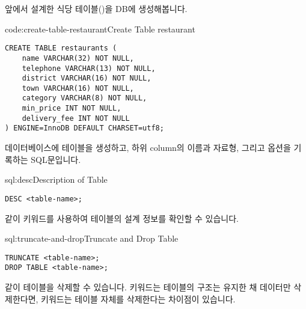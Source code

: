 앞에서 설계한 식당 테이블()을 DB에 생성해봅니다.

\begin{codeenv}{code:create-table-restaurant}{Create Table restaurant}\begin{verbatim}
CREATE TABLE restaurants (
    name VARCHAR(32) NOT NULL,
    telephone VARCHAR(13) NOT NULL,
    district VARCHAR(16) NOT NULL,
    town VARCHAR(16) NOT NULL,
    category VARCHAR(8) NOT NULL,
    min_price INT NOT NULL,
    delivery_fee INT NOT NULL
) ENGINE=InnoDB DEFAULT CHARSET=utf8;
\end{verbatim}
\end{codeenv}

\는 데이터베이스에  테이블을 생성하고, 하위 column의 이름과 자료형, 그리고 옵션을 기록하는 SQL문입니다.

\begin{sqlenv}{sql:desc}{Description of Table}\begin{verbatim}
DESC <table-name>;
\end{verbatim}
\end{sqlenv}

\과 같이  키워드를 사용하여 테이블의 설계 정보를 확인할 수 있습니다.

\begin{sqlenv}{sql:truncate-and-drop}{Truncate and Drop Table}\begin{verbatim}
TRUNCATE <table-name>;
DROP TABLE <table-name>;
\end{verbatim}
\end{sqlenv}

\과 같이 테이블을 삭제할 수 있습니다.  키워드는 테이블의 구조는 유지한 채 데이터만 삭제한다면,  키워드는 테이블 자체를 삭제한다는 차이점이 있습니다.
